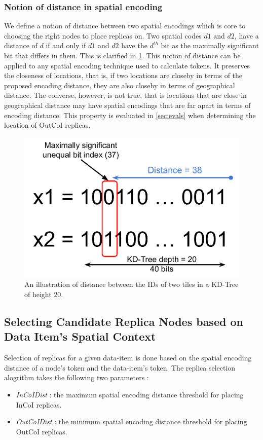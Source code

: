 \subsubsection{Notion of distance in spatial encoding}
\par We define a notion of distance between two spatial encodings which is core to choosing the right nodes to place replicas on. Two spatial codes $d1$ and $d2$, have a distance of $d$ if and only if $d1$ and $d2$ have the $d^{th}$ bit as the maximally significant bit that differs in them. This is clarified in \cref{fig:geohashdist}. This notion of distance can be applied to any spatial encoding technique used to calculate tokens. It preserves the closeness of locations, that is, if two locations are closeby in terms of the proposed encoding distance, they are also closeby in terms of geographical distance. The converse, however, is not true, that is locations that are close in geographical distance may have spatial encodings that are far apart in terms of encoding distance. This property is evaluated in \cref{sec:evals} when determining the location of OutCoI replicas.
\begin{figure}
\centering
\includegraphics[width=0.8\columnwidth]{figures/fogstore/coi_distance.pdf}
\caption{An illustration of distance between the IDs of two tiles in a KD-Tree of height 20.}
\label{fig:geohashdist}
\end{figure}

\subsection{Selecting Candidate Replica Nodes based on Data Item's Spatial Context}
Selection of replicas for a given data-item is done based on the spatial encoding distance of a node's token and the data-item's token. The replica selection alogrithm takes the following two parameters :
\begin{itemize}
\item \emph{InCoIDist} : the maximum spatial encoding distance threshold for placing InCoI replicas. 
\item \emph{OutCoIDist} : the minimum spatial encoding distance threshold for placing OutCoI replicas.  
\end{itemize}

